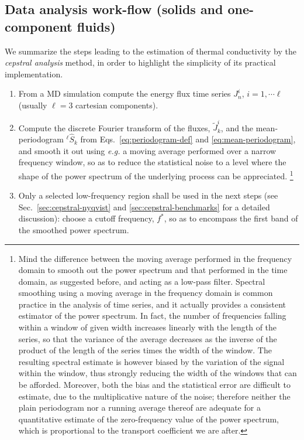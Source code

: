 \subsection{Data analysis work-flow (solids and one-component fluids)}
We summarize the steps leading to the estimation of thermal conductivity by the \textit{cepstral analysis} method, in order to highlight the simplicity of its practical implementation.
\begin{enumerate}
    \item From a MD simulation compute the energy flux time series $J_n^i$, $i=1,\cdots\ell$ (usually $\ell=3$ cartesian components).
    \item Compute the discrete Fourier transform of the fluxes, $\tilde{J}_k^i$, and the mean-periodogram $^{\ell\!}\hat{S}_k$ from Eqs.~\eqref{eq:periodogram-def} and \eqref{eq:mean-periodogram}, and smooth it out using \emph{e.g.} a moving average \cite{MovingAverage} performed over a narrow frequency window, so as to reduce the statistical noise to a level where the shape of the power spectrum of the underlying process can be appreciated.
    \footnote{Mind the difference between the moving average performed in the frequency domain to smooth out the power spectrum and that performed in the time domain, as suggested before, and acting as a low-pass filter. Spectral smoothing using a moving average in the frequency domain is common practice in the analysis of time series, and it actually provides a consistent estimator of the power spectrum. In fact, the number of frequencies falling within a window of given width increases linearly with the length of the series, so that the variance of the average decreases as the inverse of the product of the length of the series times the width of the window. The resulting spectral estimate is however biased by the variation of the signal within the window, thus strongly reducing the width of the windows that can be afforded. Moreover, both the bias and the statistical error are difficult to estimate, due to the multiplicative nature of the noise; therefore neither the plain periodogram nor a running average thereof are adequate for a quantitative estimate of the zero-frequency value of the power spectrum, which is proportional to the transport coefficient we are after.}
    \item Only a selected low-frequency region shall be used in the next steps (see Sec.~\ref{sec:cepstral-nyqvist} and \ref{sec:cepstral-benchmarks} for a detailed discussion): choose a cutoff frequency, $f^*$, so as to encompass the first band of the smoothed power spectrum. 

\end{enumerate}
